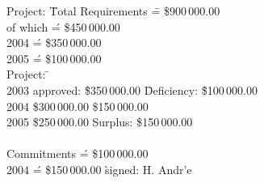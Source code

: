 \documentclass{article}
\begin{document}
\begin{tabbing}
Project: \=Total Requirements \= = \$900\,000.00 \+\\
of which  \' = \$450\,000.00 \+\\
2004 \' = \$350\,000.00 \\
2005 \' = \$100\,000.00 \\
\pushtabs 
Project: \=  \kill \- \\
2003 approved: \= \$350\,000.00 \hspace{5mm} \= Deficiency: \= \$100\,000.00\\
2004 \> \$300\,000.00 \> \> \$150\,000.00 \\
2005 \> \$250\,000.00 \> Surplus: \> \$150\,000.00 \\
\poptabs \- \\
Commitments \>  \' = \$100\,000.00 \+ \+\\
2004 \' = \$150\,000.00 \` signed: H. Andr\a'{e}


\end{tabbing}
\end{document}
